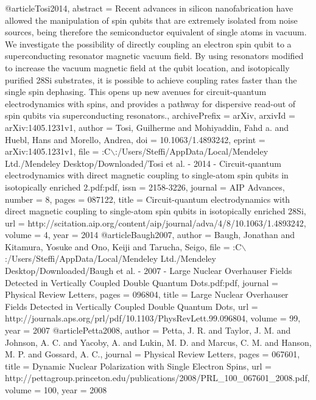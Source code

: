 @article{Tosi2014,
abstract = {Recent advances in silicon nanofabrication have allowed the manipulation of spin qubits that are extremely isolated from noise sources, being therefore the semiconductor equivalent of single atoms in vacuum. We investigate the possibility of directly coupling an electron spin qubit to a superconducting resonator magnetic vacuum field. By using resonators modified to increase the vacuum magnetic field at the qubit location, and isotopically purified 28Si substrates, it is possible to achieve coupling rates faster than the single spin dephasing. This opens up new avenues for circuit-quantum electrodynamics with spins, and provides a pathway for dispersive read-out of spin qubits via superconducting resonators.},
archivePrefix = {arXiv},
arxivId = {arXiv:1405.1231v1},
author = {Tosi, Guilherme and Mohiyaddin, Fahd a. and Huebl, Hans and Morello, Andrea},
doi = {10.1063/1.4893242},
eprint = {arXiv:1405.1231v1},
file = {:C$\backslash$:/Users/Steffi/AppData/Local/Mendeley Ltd./Mendeley Desktop/Downloaded/Tosi et al. - 2014 - Circuit-quantum electrodynamics with direct magnetic coupling to single-atom spin qubits in isotopically enriched 2.pdf:pdf},
issn = {2158-3226},
journal = {AIP Advances},
number = {8},
pages = {087122},
title = {{Circuit-quantum electrodynamics with direct magnetic coupling to single-atom spin qubits in isotopically enriched 28Si}},
url = {http://scitation.aip.org/content/aip/journal/adva/4/8/10.1063/1.4893242},
volume = {4},
year = {2014}
}
@article{Baugh2007,
author = {Baugh, Jonathan and Kitamura, Yosuke and Ono, Keiji and Tarucha, Seigo},
file = {:C$\backslash$:/Users/Steffi/AppData/Local/Mendeley Ltd./Mendeley Desktop/Downloaded/Baugh et al. - 2007 - Large Nuclear Overhauser Fields Detected in Vertically Coupled Double Quantum Dots.pdf:pdf},
journal = {Physical Review Letters},
pages = {096804},
title = {{Large Nuclear Overhauser Fields Detected in Vertically Coupled Double Quantum Dots}},
url = {http://journals.aps.org/prl/pdf/10.1103/PhysRevLett.99.096804},
volume = {99},
year = {2007}
}
@article{Petta2008,
author = {Petta, J. R. and Taylor, J. M. and Johnson, A. C. and Yacoby, A. and Lukin, M. D. and Marcus, C. M. and Hanson, M. P. and Gossard, A. C.},
journal = {Physical Review Letters},
pages = {067601},
title = {{Dynamic Nuclear Polarization with Single Electron Spins}},
url = {http://pettagroup.princeton.edu/publications/2008/PRL{\_}100{\_}067601{\_}2008.pdf},
volume = {100},
year = {2008}
}
